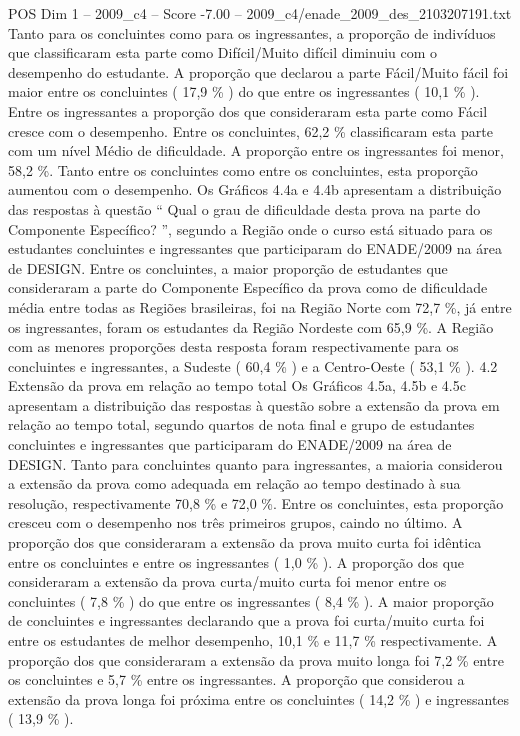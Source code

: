 \begin{textsample}{POS Dim 1 – 2009\_c4 – Score -7.00 – 2009\_c4/enade\_2009\_des\_2103207191.txt}
Tanto para os concluintes como para os ingressantes, a proporção de indivíduos que classificaram esta parte como Difícil/Muito difícil diminuiu com o desempenho do estudante.
A proporção que declarou a parte Fácil/Muito fácil foi maior entre os concluintes ( 17,9 \% ) do que entre os ingressantes ( 10,1 \% ).
Entre os ingressantes a proporção dos que consideraram esta parte como Fácil cresce com o desempenho.
Entre os concluintes, 62,2 \% classificaram esta parte com um nível Médio de dificuldade.
A proporção entre os ingressantes foi menor, 58,2 \%.
Tanto entre os concluintes como entre os concluintes, esta proporção aumentou com o desempenho.
Os Gráficos 4.4a e 4.4b apresentam a distribuição das respostas à questão “ Qual o grau de dificuldade desta prova na parte do Componente Específico? ”, segundo a Região onde o curso está situado para os estudantes concluintes e ingressantes que participaram do ENADE/2009 na área de DESIGN.
Entre os concluintes, a maior proporção de estudantes que consideraram a parte do Componente Específico da prova como de dificuldade média entre todas as Regiões brasileiras, foi na Região Norte com 72,7 \%, já entre os ingressantes, foram os estudantes da Região Nordeste com 65,9 \%.
A Região com as menores proporções desta resposta foram respectivamente para os concluintes e ingressantes, a Sudeste ( 60,4 \% ) e a Centro-Oeste ( 53,1 \% ). 4.2 Extensão da prova em relação ao tempo total Os Gráficos 4.5a, 4.5b e 4.5c apresentam a distribuição das respostas à questão sobre a extensão da prova em relação ao tempo total, segundo quartos de nota final e grupo de estudantes concluintes e ingressantes que participaram do ENADE/2009 na área de DESIGN.
Tanto para concluintes quanto para ingressantes, a maioria considerou a extensão da prova como adequada em relação ao tempo destinado à sua resolução, respectivamente 70,8 \% e 72,0 \%.
Entre os concluintes, esta proporção cresceu com o desempenho nos três primeiros grupos, caindo no último.
A proporção dos que consideraram a extensão da prova muito curta foi idêntica entre os concluintes e entre os ingressantes ( 1,0 \% ).
A proporção dos que consideraram a extensão da prova curta/muito curta foi menor entre os concluintes ( 7,8 \% ) do que entre os ingressantes ( 8,4 \% ).
A maior proporção de concluintes e ingressantes declarando que a prova foi curta/muito curta foi entre os estudantes de melhor desempenho, 10,1 \% e 11,7 \% respectivamente.
A proporção dos que consideraram a extensão da prova muito longa foi 7,2 \% entre os concluintes e 5,7 \% entre os ingressantes.
A proporção que considerou a extensão da prova longa foi próxima entre os concluintes ( 14,2 \% ) e ingressantes ( 13,9 \% ).

\end{textsample}
